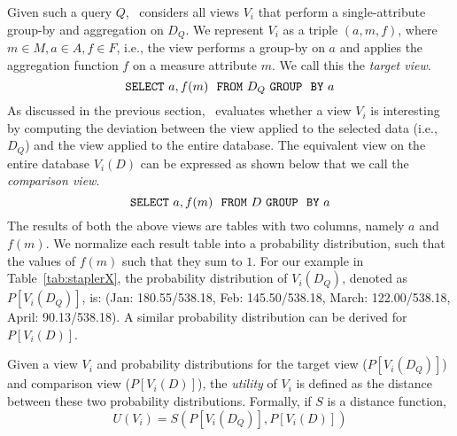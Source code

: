 Given such a query $Q$, \SeeDB\ considers all views $V_i$ that perform a
single-attribute group-by and aggregation on $D_Q$. We represent $V_i$ as a
triple $(a, m, f)$, where $m \in M, a \in A, f \in F$, i.e., the view
performs a group-by on $a$ and applies the aggregation function $f$ on a measure
attribute $m$. We call this the {\em target view}.
$${\tt SELECT \ } a, f(m) \ \ {\tt FROM} \  D_Q\  {\tt GROUP \ \ BY} \ a$$ 
As discussed in the previous section, \SeeDB\ evaluates
whether a view $V_i$ is interesting
by computing the deviation between the view applied to the selected data (i.e., $D_Q$) 
and the view applied to the entire database.
The equivalent view on the entire database $V_i (D)$ can be expressed as shown
below that we call the {\em comparison view}. 
$${\tt SELECT \ } a, f(m) \ \ {\tt FROM} \  D\  {\tt GROUP \ \ BY} \ a$$
The results of both the above views are tables with two columns, namely $a$ and
$f(m)$. We normalize each result table into a probability distribution, such
that the values of $f(m)$ such that they sum to $1$.
For our example in Table~\ref{tab:staplerX}, the probability distribution of
$V_i(D_Q)$, denoted as $P[V_i (D_Q)]$, is: (Jan: 180.55/538.18, Feb:
145.50/538.18, March: 122.00/538.18,  April: 90.13/538.18). A similar
probability distribution can be derived for $P[V_i (D)]$.

Given a view $V_i$ and probability distributions for the
target view  ($P[V_i (D_Q)]$) and comparison view ($P[V_i (D)]$), the
{\em utility} of $V_i$ is defined as the distance between these two probability
distributions. Formally, if $S$ is a distance function,
$$ U (V_i) = S ( P[V_i (D_Q)], P[V_i (D)] )$$

